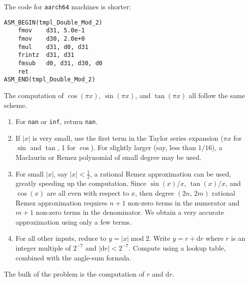 \documentclass{article}
\theoremstyle{plain}
\begin{document}
        \newpage
        The code for \texttt{aarch64} machines is shorter:
        \begin{mdframed}
            \begin{lstlisting}[language={[aarch64]Assembler}]
ASM_BEGIN(tmpl_Double_Mod_2)
    fmov    d31, 5.0e-1
    fmov    d30, 2.0e+0
    fmul    d31, d0, d31
    frintz  d31, d31
    fmsub   d0, d31, d30, d0
    ret
ASM_END(tmpl_Double_Mod_2)
            \end{lstlisting}
        \end{mdframed}
        The computation of $\cos(\pi{x})$, $\sin(\pi{x})$, and $\tan(\pi{x})$
        all follow the same scheme.
        \begin{enumerate}
            \item
                For \texttt{nan} or \texttt{inf}, return \texttt{nan}.
            \item
                If $|x|$ is very small, use the first term in the Taylor
                series expansion ($\pi{x}$ for $\sin$ and $\tan$, 1 for
                $\cos$). For slightly larger (say, less than $1/16$), a
                Maclaurin or Remez polynomial of small degree may be used.
            \item
                For small $|x|$, say $|x|<\frac{1}{2}$, a rational Remez
                approximation can be used, greatly speeding up the computation.
                Since $\sin(x)/x$, $\tan(x)/x$, and $\cos(x)$ are all even
                with respect to $x$, then degree $(2n,\,2m)$ rational Remez
                approximation requires $n+1$ non-zero terms in the numerator
                and $m+1$ non-zero terms in the denominator. We obtain a very
                accurate approximation using only a few terms.
            \item
                For all other inputs, reduce to $y=|x|\;\textrm{mod}\;2$.
                Write $y=r+\textrm{d}r$ where $r$ is an integer multiple of
                $2^{-7}$ and $|\textrm{d}r|<2^{-7}$. Compute using a lookup
                table, combined with the angle-sum formula.
        \end{enumerate}
        The bulk of the problem is the computation of $r$ and $\textrm{d}r$.
\end{document}
